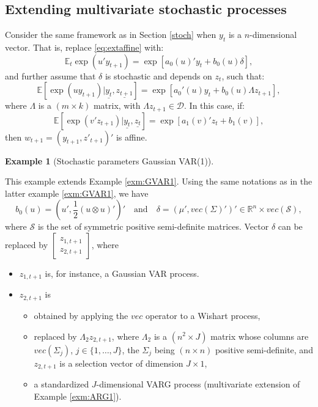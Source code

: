 \documentclass[
  12pt,
]{book}
\providecommand{\tightlist}{%
  \setlength{\itemsep}{0pt}\setlength{\parskip}{0pt}}
\theoremstyle{definition}
\theoremstyle{definition}
\newtheorem{example}{Example}[chapter]
\theoremstyle{definition}
\theoremstyle{definition}
\theoremstyle{remark}
\begin{document}
\hypertarget{extending-multivariate-stochastic-processes}{%
\subsection{Extending multivariate stochastic processes}\label{extending-multivariate-stochastic-processes}}

Consider the same framework as in Section \ref{stoch} when \(y_t\) is a \(n\)-dimensional vector. That is, replace \eqref{eq:extaffine} with:
\begin{equation}
\mathbb{E}_t   \exp(u' y_{t+1}) = \exp[a_0(u)'y_t+b_0(u)\delta],\label{eq:Multiextaffine}
\end{equation}
and further assume that \(\delta\) is stochastic and depends on \(z_t\), such that:
\[
\mathbb{E}[\exp(u y_{t+1})|\underline{y_t}, \underline{z_{t+1}}] = \exp[a_0'(u)y_t+b_0(u)\Lambda z_{t+1}],
\]
where \(\Lambda\) is a \((m\times k)\) matrix, with \(\Lambda z_{t+1} \in \mathcal{D}\). In this case, if:
\[
\mathbb{E}[\exp(v' z_{t+1})|\underline{y_t}, \underline{z_{t}}] = \exp[a_1(v)'z_t+b_1(v)],
\]
then \(w_{t+1} = (y_{t+1}, z'_{t+1})'\) is affine.

\begin{example}[Stochastic parameters Gaussian VAR(1)]
\protect\hypertarget{exm:RSVAR}{}\label{exm:RSVAR}

This example extends Example \ref{exm:GVAR1}. Using the same notations as in the latter example \ref{exm:GVAR1}, we have
\[
b_0(u) = \left(u', \frac{1}{2} (u \otimes u)'\right)' \quad \mbox{and} \quad\delta = (\mu', vec(\Sigma)')' \in \mathbb{R}^n \times vec(\mathcal{S}),
\]
where \(\mathcal{S}\) is the set of symmetric positive semi-definite matrices. Vector \(\delta\) can be replaced by \(\left[ \begin{array}{l} z_{1,t+1} \\ z_{2,t+1}\end{array} \right]\), where

\begin{itemize}
\tightlist
\item
  \(z_{1,t+1}\) is, for instance, a Gaussian VAR process.
\item
  \(z_{2,t+1}\) is

  \begin{itemize}
  \tightlist
  \item
    obtained by applying the \(vec\) operator to a Wishart process,
  \item
    replaced by \(\Lambda_2 z_{2,t+1}\), where \(\Lambda_2\) is a \((n^2 \times J)\) matrix whose columns are \(vec(\Sigma_j)\), \(j \in \{1,\dots,J\}\), the \(\Sigma_j\) being \((n \times n)\) positive semi-definite, and \(z_{2,t+1}\) is a selection vector of dimension \(J \times 1\),
  \item
    a standardized \(J\)-dimensional VARG process (multivariate extension of Example \ref{exm:ARG1}).
  \end{itemize}
\end{itemize}

\end{example}
\end{document}
